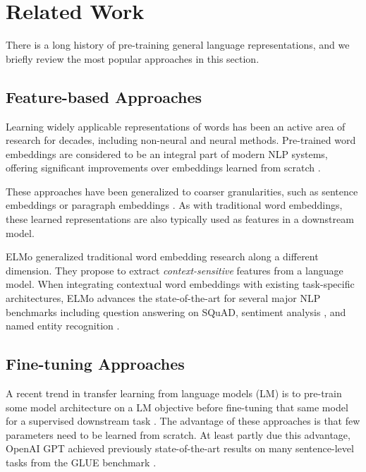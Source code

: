 
\section {Related Work}
There is a long history of pre-training general language representations, and we briefly review the most popular approaches in this section. 

\subsection {Feature-based Approaches}
Learning widely applicable representations of words has been an active area of research for decades, including non-neural \citep{Peter1992, Rie2005, John2006} and neural \citep{Ronan2008, Tomas2013, Jeffrey2014} methods. Pre-trained word embeddings are considered to be an integral part of modern NLP systems, offering significant improvements over embeddings learned from scratch \citep{Joseph2010}.

These approaches have been generalized to coarser granularities, such as sentence embeddings \citep{Ryan2015, Lajanugen2018} or paragraph embeddings \citep{Quoc2014}. As with traditional word embeddings, these learned representations are also typically used as features in a downstream model.

ELMo \citep{Matthew2017} generalized traditional word embedding research along a different dimension. They propose to extract \emph{context-sensitive} features from a language model. When integrating contextual word embeddings with existing task-specific architectures, ELMo advances the state-of-the-art for several major NLP benchmarks \citep{Matthew2018} including question answering \citep{Pranav2016} on SQuAD, sentiment analysis \citep{Richard2013}, and named entity recognition \citep{Erik2003}.

\subsection {Fine-tuning Approaches}
A recent trend in transfer learning from language models (LM) is to pre-train some model architecture on a LM objective before fine-tuning that same model for a supervised downstream task \citep{Andrew2015, Jeremy2018, Alec2018}. The advantage of these approaches is that few parameters need to be learned from scratch. At least partly due this advantage, OpenAI GPT \citep{Alec2018} achieved previously state-of-the-art results on many sentence-level tasks from the GLUE benchmark \citep{Alex2018}.

